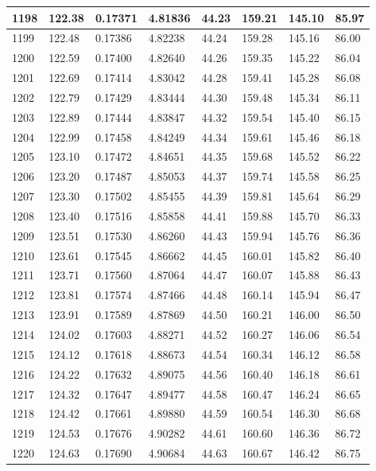 \documentclass[12pt,a4paper,twoside]{article}
\begin{document}
\begin{center}
\begin{longtable}{l l l l | l l l l}
1198 & 122.38 & 0.17371 & 4.81836 & 44.23 & 159.21 & 145.10 & 85.97 \\ \hline
1199 & 122.48 & 0.17386 & 4.82238 & 44.24 & 159.28 & 145.16 & 86.00 \\ \hline
1200 & 122.59 & 0.17400 & 4.82640 & 44.26 & 159.35 & 145.22 & 86.04 \\ \hline
1201 & 122.69 & 0.17414 & 4.83042 & 44.28 & 159.41 & 145.28 & 86.08 \\ \hline
1202 & 122.79 & 0.17429 & 4.83444 & 44.30 & 159.48 & 145.34 & 86.11 \\ \hline
1203 & 122.89 & 0.17444 & 4.83847 & 44.32 & 159.54 & 145.40 & 86.15 \\ \hline
1204 & 122.99 & 0.17458 & 4.84249 & 44.34 & 159.61 & 145.46 & 86.18 \\ \hline
1205 & 123.10 & 0.17472 & 4.84651 & 44.35 & 159.68 & 145.52 & 86.22 \\ \hline
1206 & 123.20 & 0.17487 & 4.85053 & 44.37 & 159.74 & 145.58 & 86.25 \\ \hline
1207 & 123.30 & 0.17502 & 4.85455 & 44.39 & 159.81 & 145.64 & 86.29 \\ \hline
1208 & 123.40 & 0.17516 & 4.85858 & 44.41 & 159.88 & 145.70 & 86.33 \\ \hline
1209 & 123.51 & 0.17530 & 4.86260 & 44.43 & 159.94 & 145.76 & 86.36 \\ \hline
1210 & 123.61 & 0.17545 & 4.86662 & 44.45 & 160.01 & 145.82 & 86.40 \\ \hline
1211 & 123.71 & 0.17560 & 4.87064 & 44.47 & 160.07 & 145.88 & 86.43 \\ \hline
1212 & 123.81 & 0.17574 & 4.87466 & 44.48 & 160.14 & 145.94 & 86.47 \\ \hline
1213 & 123.91 & 0.17589 & 4.87869 & 44.50 & 160.21 & 146.00 & 86.50 \\ \hline
1214 & 124.02 & 0.17603 & 4.88271 & 44.52 & 160.27 & 146.06 & 86.54 \\ \hline
1215 & 124.12 & 0.17618 & 4.88673 & 44.54 & 160.34 & 146.12 & 86.58 \\ \hline
1216 & 124.22 & 0.17632 & 4.89075 & 44.56 & 160.40 & 146.18 & 86.61 \\ \hline
1217 & 124.32 & 0.17647 & 4.89477 & 44.58 & 160.47 & 146.24 & 86.65 \\ \hline
1218 & 124.42 & 0.17661 & 4.89880 & 44.59 & 160.54 & 146.30 & 86.68 \\ \hline
1219 & 124.53 & 0.17676 & 4.90282 & 44.61 & 160.60 & 146.36 & 86.72 \\ \hline
1220 & 124.63 & 0.17690 & 4.90684 & 44.63 & 160.67 & 146.42 & 86.75 \\ \hline

\end{longtable}
\end{center}
\end{document}
